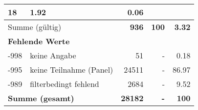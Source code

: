 \begin{longtable}{lXrrr}
       \num{18} &
       \num[round-mode=places,round-precision=2]{1,92} &
         \num[round-mode=places,round-precision=2]{0,06} \\
     \midrule
     \multicolumn{2}{l}{Summe (gültig)} &
       \textbf{\num{936}} &
     \textbf{100} &
       \textbf{\num[round-mode=places,round-precision=2]{3,32}} \\
     \multicolumn{5}{l}{\textbf{Fehlende Werte}}\\
       -998 &
       keine Angabe &
         \num{51} &
        - &
         \num[round-mode=places,round-precision=2]{0,18} \\
       -995 &
       keine Teilnahme (Panel) &
         \num{24511} &
        - &
         \num[round-mode=places,round-precision=2]{86,97} \\
       -989 &
       filterbedingt fehlend &
         \num{2684} &
        - &
         \num[round-mode=places,round-precision=2]{9,52} \\
     \midrule
     \multicolumn{2}{l}{\textbf{Summe (gesamt)}} &
          \textbf{\num{28182}} &
        \textbf{-} &
        \textbf{100} \\
     \bottomrule
     \end{longtable}
     
